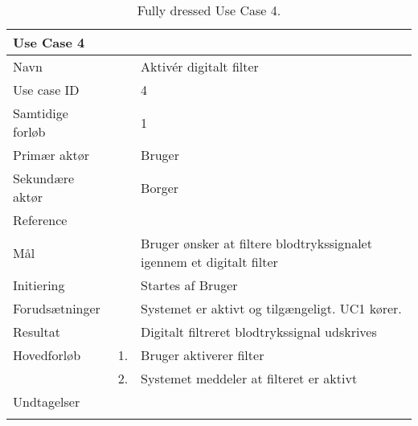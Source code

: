 \begin{longtabu} to  %
    {\large \textbf{Use Case 4}} && \\
    \toprule
    Navn &&    Aktivér digitalt filter\\
    Use case ID &&    4\\
    Samtidige forløb &&   1\\
    Primær aktør &&    Bruger\\
    Sekundære aktør &&	Borger \\
    Reference &&      \\
    Mål &&    Bruger ønsker at filtere blodtrykssignalet igennem et digitalt filter\\
    Initiering &&	Startes af Bruger\\
    Forudsætninger &&  Systemet er aktivt og tilgængeligt. UC1 kører.  \\
    Resultat &&		Digitalt filtreret blodtrykssignal udskrives                 \\ \midrule
    Hovedforløb &    1. &    Bruger aktiverer filter\\[-1ex]   						 	
                &    2. &    Systemet meddeler at filteret er aktivt\newline\\ \midrule
                
    Undtagelser &     &      \\ \bottomrule
\caption{Fully dressed Use Case 4.}
\label{UC4}
\end{longtabu}

